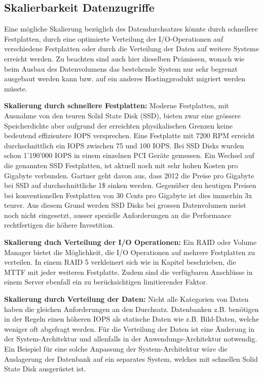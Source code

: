 \subsection{Skalierbarkeit Datenzugriffe}
Eine mögliche Skalierung bezüglich des Datendurchsatzes könnte durch schnellere Festplatten, durch eine optimierte Verteilung der I/O-Operationen auf verschiedene Festplatten oder durch die Verteilung der Daten auf weitere Systeme erreicht werden. Zu beachten sind auch hier dieselben Prämissen, wonach wie beim Ausbau des Datenvolumens das bestehende System nur sehr begrenzt ausgebaut werden kann bzw. auf ein anderes Hostingprodukt migriert werden müsste.

\textbf{Skalierung durch schnellere Festplatten:}
Moderne Festplatten, mit Ausnahme von den teuren Solid State Disk (SSD), bieten zwar eine grössere Speicherdichte aber aufgrund der erreichten physikalischen Grenzen keine bedeutend effizientere IOPS versprechen. Eine Festplatte mit 7200 RPM erreicht durchschnittlich ein IOPS zwischen 75 und 100 IOPS. Bei SSD Disks wurden schon 1'190'000 IOPS in einem einzelnen PCI Geräte gemessen.\cite{Symantec2011} \cite{Fusionio} 
Ein Wechsel auf die genannten SSD Festplatten, ist aktuell noch mit sehr hohen Kosten pro Gigabyte verbunden. Gartner geht davon aus, dass 2012 die Preise pro Gigabyte bei SSD auf durchschnittliche 1\$ sinken werden. Gegenüber den heutigen Preisen bei konventionellen Festplatten von 30 Cents pro Gigabyte ist dies immerhin 3x teurer. Aus diesem Grund werden SSD Disks bei grossen Datenvolumen meist noch nicht eingesetzt, ausser spezielle Anforderungen an die Performance rechtfertigen die höhere Investition. \cite{AgamShah2011}

\textbf{Skalierung duch Verteilung der I/O Operationen:}
Ein RAID oder Volume Manager bietet die Möglichkeit, die I/O Operationen auf mehrere Festplatten zu verteilen. In einem RAID 5 verkleinert sich wie in Kapitel  beschrieben, die MTTF mit jeder weiteren Festplatte. Zudem sind die verfügbaren Anschlüsse in einem Server ebenfall ein zu berücksichtigen limitierender Faktor.

\textbf{Skalierung durch Verteilung der Daten:}
Nicht alle Kategorien von Daten haben die gleichen Anforderungen an den Durchsatz. Datenbanken z.B. benötigen in der Regeln einen höheren IOPS als statische Daten wie z.B. Bild-Daten, welche weniger oft abgefragt werden. Für die Verteilung der Daten ist eine Änderung in der System-Architektur und allenfalls in der Anwendungs-Architektur notwendig. Ein Beispiel für eine solche Anpassung der System-Architektur wäre die Auslagerung der Datenbank auf ein separates System, welches mit schnellen Solid State Disk ausgerüstet ist. 


